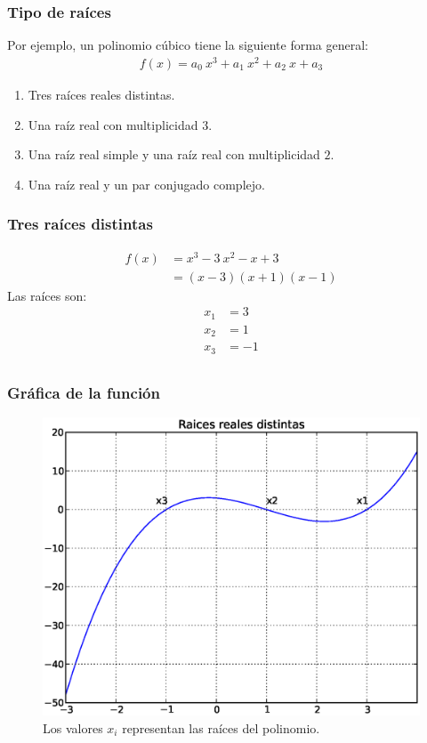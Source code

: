 \documentclass[12pt]{beamer}
\begin{document}
\begin{frame}
\frametitle{Tipo de raíces}
Por ejemplo, un polinomio cúbico tiene la siguiente forma general:
\pause
\begin{align*}
f (x) = a_{0} \: x^{3} + a_{1} \: x^{2} + a_{2} \: x + a_{3}
\end{align*}
\begin{enumerate}[<+->]
\item Tres raíces reales distintas.
\item Una raíz real con multiplicidad $3$.
\item Una raíz real simple y una raíz real con multiplicidad $2$.
\item Una raíz real y un par conjugado complejo.
\end{enumerate}
\end{frame}
\begin{frame}[fragile]
\frametitle{Tres raíces distintas}
\begin{align*}
f (x) & = x^{3} - 3 \: x^{2} - x + 3 \\
&= (x - 3)(x + 1)(x - 1)
\end{align*}
Las raíces son:
\begin{align*}
x_{1} &= 3 \\
x_{2} &= 1 \\
x_{3} &= -1 \\
\end{align*}
\end{frame}
\begin{frame}[fragile]
\frametitle{Gráfica de la función}
\begin{figure}
	\centering
	\includegraphics[scale=0.4]{Imagenes/raices01.eps}
	\caption{Los valores $x_{i}$ representan las raíces del polinomio.}
\end{figure}
\end{frame}
\end{document}

